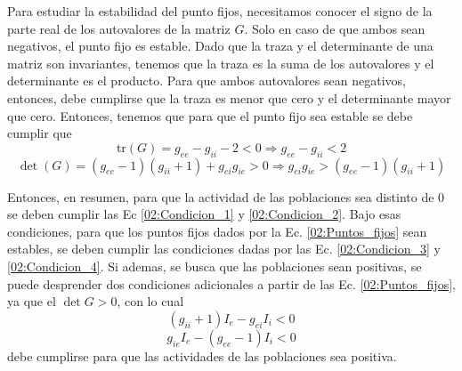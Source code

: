 Para estudiar la estabilidad del punto fijos, necesitamos conocer el signo de la parte real de los autovalores de la matriz $G$. Solo en caso de que ambos sean negativos, el punto fijo es estable. Dado que la traza y el determinante de una matriz son invariantes, tenemos que la traza es la suma de los autovalores y el determinante es el producto. Para que ambos autovalores sean negativos, entonces, debe cumplirse que la traza es menor que cero y el determinante mayor que cero. Entonces, tenemos que para que el punto fijo sea estable se debe cumplir que
\begin{equation}
    \text{tr}(G) = g_{ee} - g_{ii} - 2 < 0 \Rightarrow g_{ee} - g_{ii} < 2
    \label{02:Condicion_3}
\end{equation}
\begin{equation}
    \det (G) = ( g_{ee} - 1 ) ( g_{ii} + 1) + g_{ei}g_{ie} > 0 \Rightarrow g_{ei} g_{ie} >  ( g_{ee} - 1 ) ( g_{ii} + 1)
    \label{02:Condicion_4}
\end{equation}

Entonces, en resumen, para que la actividad de las poblaciones sea distinto de $0$ se deben cumplir las Ec \ref{02:Condicion_1} y \ref{02:Condicion_2}. Bajo esas condiciones, para que los puntos fijos dados por la Ec. \ref{02:Puntos_fijos} sean estables, se deben cumplir las condiciones dadas por las Ec. \ref{02:Condicion_3} y \ref{02:Condicion_4}. Si ademas, se busca que las poblaciones sean positivas, se puede desprender dos condiciones adicionales a partir de las Ec. \ref{02:Puntos_fijos}, ya que el $\det G > 0$, con lo cual
\begin{equation}
    \left(g_{ii} + 1\right) I_{e} -g_{ei} I_{i} < 0
\end{equation}
\begin{equation}
    g_{ie} I_e - \left( g_{ee} - 1 \right) I_{i} < 0
\end{equation}
debe cumplirse para que las actividades de las poblaciones sea positiva.